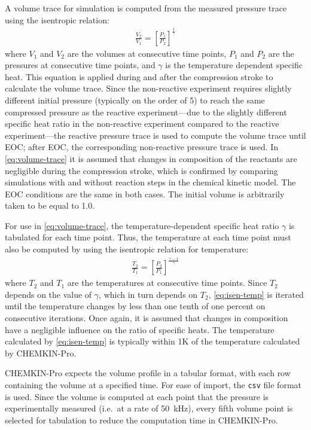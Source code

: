 \documentclass[../main.tex]{subfiles}
\begin{document}
A volume trace for simulation is computed from the measured
pressure trace using the isentropic relation:
%
\begin{align}
\frac{V_2}{V_1} = \left[\frac{P_1}{P_2}\right]^{\frac{1}{\gamma}}
\label{eq:volume-trace}
\end{align}
%
where $V_1$ and $V_2$ are the volumes at consecutive time points,
$P_1$ and $P_2$ are the pressures at consecutive time points, and
$\gamma$ is the temperature dependent specific heat. This equation
is applied during and after the compression stroke to calculate
the volume trace. Since the non-reactive experiment requires slightly
different initial pressure (typically on the order of \SI{5}{\torr}) to reach the same
compressed pressure as the reactive experiment---due to the slightly
different specific heat ratio in the non-reactive experiment compared
to the reactive experiment---the reactive pressure trace is used to
compute the volume trace until EOC; after EOC, the corresponding
non-reactive pressure trace is used. In \cref{eq:volume-trace} it is assumed that
changes in composition of the reactants are negligible during the
compression stroke, which is confirmed by comparing simulations with and
without reaction steps in the chemical kinetic model. The EOC conditions
are the same in both cases. The initial volume is arbitrarily taken
to be equal to \num{1.0}.

For use in \cref{eq:volume-trace}, the temperature-dependent specific
heat ratio $\gamma$ is tabulated for each time point. Thus, the
temperature at each time point must also be computed by using the
isentropic relation for temperature:
%
\begin{align}
\frac{T_2}{T_1} = \left[\frac{P_2}{P_1}\right]^{\frac{\gamma-1}{\gamma}}
\label{eq:isen-temp}
\end{align}
%
where $T_2$ and $T_1$ are the temperatures at consecutive time points.
Since $T_2$ depends on the value of $\gamma$, which in turn depends
on $T_2$, \cref{eq:isen-temp} is iterated until the temperature
changes by less than one tenth of one percent on consecutive iterations.
Once again, it is assumed that changes in composition have a negligible
influence on the ratio of specific heats.
The temperature calculated by \cref{eq:isen-temp} is typically within
1K of the temperature calculated by CHEMKIN-Pro.

CHEMKIN-Pro expects the volume profile in a tabular format, with each row
containing the volume at a specified time. For ease of import, the
\texttt{csv} file format is used. Since the volume is computed at each
point that the pressure is experimentally measured (i.e.\ at a rate of
\SI{50}{\kilo\hertz}), every fifth volume point is selected for tabulation
to reduce the computation time in CHEMKIN-Pro.
\end{document}
